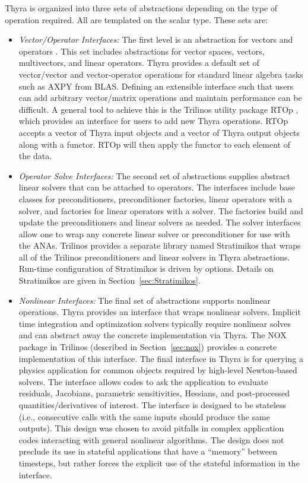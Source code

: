 Thyra is organized into three sets of abstractions depending on the type of operation required. All are templated on the scalar type. These sets are:
\begin{itemize}
\item \emph{Vector/Operator Interfaces:} The first level is an abstraction for vectors and operators \cite{Bartlett2007}. This set includes abstractions for vector spaces, vectors, multivectors, and linear operators. Thyra provides a default set of vector/vector and vector-operator operations for standard linear algebra tasks such as AXPY from BLAS. Defining an extensible interface such that users can add arbitrary vector/matrix operations and maintain performance can be difficult. A general tool to achieve this is the Trilinos utility package RTOp \cite{rtop}, which provides an interface for users to add new Thyra operations. RTOp accepts a vector of Thyra input objects and a vector of Thyra output objects along with a functor. RTOp will then apply the functor to each element of the data.

\item \emph{Operator Solve Interfaces:} The second set of abstractions supplies abstract linear solvers that can be attached to operators. The interfaces include base classes for preconditioners, preconditioner factories, linear operators with a solver, and factories for linear operators with a solver. The factories build and update the preconditioners and linear solvers as needed. The solver interfaces allow one to wrap any concrete linear solver or preconditioner for use with the ANAs. Trilinos provides a separate library named Stratimikos that wraps all of the Trilinos preconditioners and linear solvers in Thyra abstractions. Run-time configuration of Stratimikos is driven by  options.
Details on Stratimikos are given in Section~\ref{sec:Stratimikos}.

\item \emph{Nonlinear Interfaces:} The final set of abstractions supports nonlinear operations. Thyra provides an interface that wraps nonlinear solvers. Implicit time integration and optimization solvers typically require nonlinear solves and can abstract away the concrete implementation via Thyra. The NOX package in Trilinos (described in Section~\ref{sec:nox}) provides a concrete implementation of this interface. The final interface in Thyra is for querying a physics application for common objects required by high-level Newton-based solvers. The  interface allows codes to ask the application to evaluate residuals, Jacobians, parametric sensitivities, Hessians, and post-processed quantities/derivatives of interest. The interface is designed to be stateless (i.e., consecutive calls with the same inputs should produce the same outputs). This design was chosen to avoid pitfalls in complex application codes interacting with general nonlinear algorithms. The design does not preclude its use in stateful applications that have a ``memory'' between timesteps, but rather forces the explicit use of the stateful information in the interface.
\end{itemize}


